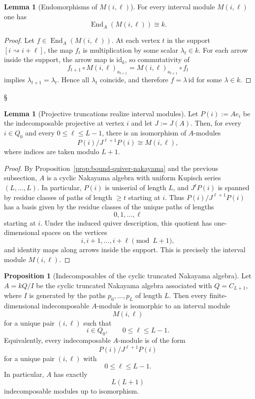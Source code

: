 \documentclass{article}
\newcommand{\End}{\operatorname{End}}
\theoremstyle{definition}
\newtheorem{proposition}[theorem]{Proposition}
\newtheorem{lemma}[theorem]{Lemma}
\begin{document}
\begin{lemma}[Endomorphisms of $M(i,\ell)$]\label{lem:Miell-end}
For every interval module $M(i,\ell)$ one has
\[
\End_A(M(i,\ell))\cong k.
\]
\end{lemma}

\begin{proof}
Let $f\in \End_A(M(i,\ell))$.
At each vertex $t$ in the support $[i\rightsquigarrow i+\ell]$, the map $f_t$
is multiplication by some scalar $\lambda_t\in k$.
\noindent
For each arrow inside the support, the arrow map is $\mathrm{id}_k$, so
commutativity of
\[
f_{t+1}\circ M(i,\ell)_{a_{t+1}} = M(i,\ell)_{a_{t+1}}\circ f_t
\]
implies $\lambda_{t+1}=\lambda_t$. Hence all $\lambda_t$ coincide, and
therefore $f=\lambda\,\mathrm{id}$ for some $\lambda\in k$.
\end{proof}§

\begin{lemma}[Projective truncations realize interval modules]
Let $P(i):=Ae_i$ be the indecomposable projective at vertex $i$ and let $J:=J(A)$.
Then, for every $i\in Q_0$ and every $0\le \ell\le L-1$, there is an isomorphism of $A$-modules
\[
P(i)/J^{\ell+1}P(i)\cong M(i,\ell),
\]
where indices are taken modulo $L+1$.
\end{lemma}

\begin{proof}
By Proposition~\ref{prop:bound-quiver-nakayama} and the previous subsection,
$A$ is a cyclic Nakayama algebra with uniform Kupisch series $(L,\ldots,L)$.
In particular, $P(i)$ is uniserial of length $L$, and $J^tP(i)$ is spanned
by residue classes of paths of length $\ge t$ starting at $i$.
\noindent
Thus $P(i)/J^{\ell+1}P(i)$ has a basis given by the residue classes of the
unique paths of lengths
\[
0,1,\dots,\ell
\]
starting at $i$.
\noindent
Under the induced quiver description, this quotient has one-dimensional
spaces on the vertices
\[
i,i+1,\dots,i+\ell \pmod{L+1},
\]
and identity maps along arrows inside the support. This is precisely the
interval module $M(i,\ell)$.
\end{proof}
\begin{proposition}[Indecomposables of the cyclic truncated Nakayama algebra]\label{prop:indecomp-cyclic-nakayama}
Let $A=kQ/I$ be the cyclic truncated Nakayama algebra associated with $Q=C_{L+1}$,
where $I$ is generated by the paths $p_0,\dots,p_L$ of length $L$.
Then every finite-dimensional indecomposable $A$-module is isomorphic to an
interval module
\[
M(i,\ell)
\]
for a unique pair $(i,\ell)$ such that
\[
i\in Q_0, \qquad 0\le \ell\le L-1 .
\]
\noindent
Equivalently, every indecomposable $A$-module is of the form
\[
P(i)/J^{\ell+1}P(i)
\]
for a unique pair $(i,\ell)$ with
\[
0 \le \ell \le L-1 .
\]
\noindent
In particular, $A$ has exactly
\[
L(L+1)
\]
indecomposable modules up to isomorphism.
\end{proposition}
\end{document}
